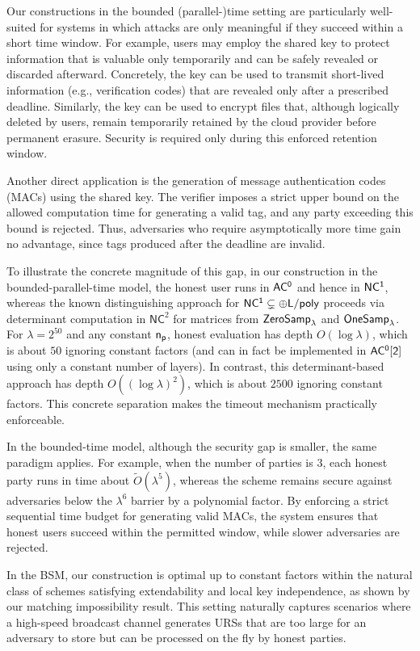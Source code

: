 Our constructions in the bounded (parallel-)time setting are particularly well-suited for systems in which attacks are only meaningful if they succeed within a short time window. For example, users may employ the shared key to protect information that is valuable only temporarily and can be safely revealed or discarded afterward. Concretely, the key can be used to transmit short-lived information (e.g., verification codes) that are revealed only after a prescribed deadline. Similarly, the key can be used to encrypt files that, although logically deleted by users, remain temporarily retained by the cloud provider before permanent erasure. Security is required only during this enforced retention window.

Another direct application is the generation of message authentication codes (MACs) using the shared key. The verifier imposes a strict upper bound on the allowed computation time for generating a valid tag, and any party exceeding this bound is rejected. Thus, adversaries who require asymptotically more time gain no advantage, since tags produced after the deadline are invalid.

To illustrate the concrete magnitude of this gap, in our construction in the bounded-parallel-time model, the honest user runs in $\mathsf{AC^0}$ and hence in $\mathsf{NC^1}$, whereas the known distinguishing approach for $\mathsf{NC^1} \subsetneq {\sf \oplus L/poly}$ proceeds via determinant computation in $\mathsf{NC}^2$ for matrices from ${\mathsf{ZeroSamp}}_\lambda$ and ${\mathsf{OneSamp}}_\lambda$. For $\lambda = 2^{50}$ and any constant $\mathsf{n_p}$, honest evaluation has depth $O(\log \lambda)$, which is about $50$ ignoring constant factors (and can in fact be implemented in $\mathsf{AC^0[2]}$ using only a constant number of layers). In contrast, this determinant-based approach has depth $O((\log \lambda)^2)$, which is about $2500$ ignoring constant factors. This concrete separation makes the timeout mechanism practically enforceable.

In the bounded-time model, although the security gap is smaller, the same paradigm applies. For example, when the number of parties is $3$, each honest party runs in time about $\tilde O(\lambda^5)$, whereas the scheme remains secure against adversaries below the $\lambda^6$ barrier by a polynomial factor. By enforcing a strict sequential time budget for generating valid MACs, the system ensures that honest users succeed within the permitted window, while slower adversaries are rejected.

In the BSM, our construction is optimal up to constant factors within the natural class of schemes satisfying extendability and local key independence, as shown by our matching impossibility result. This setting naturally captures scenarios where a high-speed broadcast channel generates URSs that are too large for an adversary to store but can be processed on the fly by honest parties.

